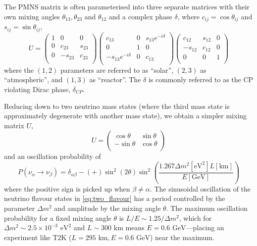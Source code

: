 The PMNS matrix is often parameterised into three separate matrices with their own mixing angles $\theta_{13},\theta_{23}$ and $\theta_{12}$ and a complex phase $\delta$, where $c_{ij}=\cos\theta_{ij}$ and $s_{ij}=\sin\theta_{ij}$\cite{boris_mixing},
\begin{equation}
U = 
\begin{pmatrix}
1 & 0 & 0 \\
0 & c_{23} & s_{23} \\
0 & -s_{23} & c_{23} \\
\end{pmatrix}
\begin{pmatrix}
c_{13} & 0 & s_{13}e^{-i\delta} \\
0 & 1 & 0 \\
-s_{13}e^{-i\delta} & 0 & c_{13} \\
\end{pmatrix}
\begin{pmatrix}
c_{12} & s_{12} & 0 \\
-s_{12} & c_{12} & 0 \\
0 & 0 & 1 \\
\end{pmatrix}
\end{equation}
where the $(1,2)$ parameters are referred to as ``solar'', $(2,3)$ as ``atmospheric'', and $(1,3)$ as ``reactor''. The $\delta$ is commonly referred to as the CP violating Dirac phase, $\delta_{CP}$. 

Reducing down to two neutrino mass states (where the third mass state is approximately degenerate with another mass state), we obtain a simpler mixing matrix $U$,
\begin{equation}
U = 
\begin{pmatrix}
\cos\theta & \sin\theta \\
- \sin\theta & \cos \theta \\
\end{pmatrix}
\end{equation}
and an oscillation probability of
\begin{equation}
P(\nu_\alpha \rightarrow \nu_\beta) = \delta_{\alpha \beta} -(+) \sin^2 \left( 2\theta \right) \sin^2 \left( \frac{1.267 \Delta m^2 \left[\text{eV}^2\right] L\left[\text{km}\right]}{E\left[\text{GeV}\right]} \right)
\label{eq:two_flavour}
\end{equation}
where the positive sign is picked up when $\beta \neq \alpha$. The sinusoidal oscillation of the neutrino flavour states in \autoref{eq:two_flavour} has a period controlled by the parameter $\Delta m^2$ and amplitude by the mixing angle $\theta$. The maximum oscillation probability for a fixed mixing angle $\theta$ is $L/E \sim 1.25/\Delta m^2$, which for $\Delta m^2 \sim 2.5\times10^{-3}\text{ eV}^2$ and $L\sim300\text{ km}$ means $E=0.6\text{ GeV}$---placing an experiment like T2K ($L=295\text{ km}, E = 0.6\text{ GeV}$) near the maximum.

